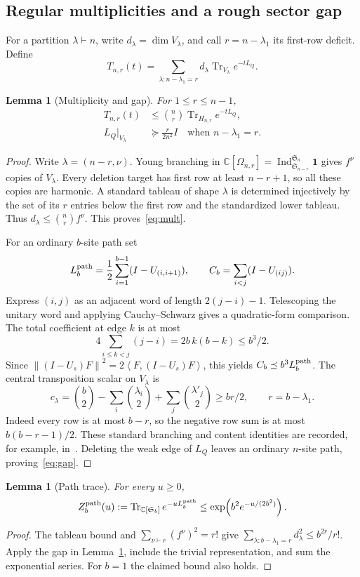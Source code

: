 \documentclass[11pt]{article}
\newtheorem{lemma}[theorem]{Lemma}
\theoremstyle{remark}
\newcommand{\C}{\mathbb C}
\newcommand{\Sn}{\mathfrak S_n}
\newcommand{\Tr}{\operatorname{Tr}}
\newcommand{\ind}{\mathbf 1}
\newcommand{\norm}[1]{\left\lVert #1\right\rVert}
\newcommand{\ip}[2]{\left\langle #1,#2\right\rangle}
\begin{document}
\subsection{Regular multiplicities and a rough sector gap}
For a partition $\lambda\vdash n$, write $d_\lambda=\dim V_\lambda$, and call
$r=n-\lambda_1$ its first-row deficit. Define
\[
 T_{n,r}(t)=\sum_{\lambda:n-\lambda_1=r}d_\lambda\Tr_{V_\lambda}e^{-tL_Q}.
\]
\begin{lemma}[Multiplicity and gap]\label{lem:multgap}
For $1\leq r\leq n-1$,
\begin{align}
 T_{n,r}(t)&\leq\binom nr\Tr_{H_{n,r}}e^{-tL_Q},\label{eq:mult}\\
 L_Q|_{V_\lambda}&\succeq \frac r{2n^2}I
 \quad\text{when }n-\lambda_1=r.\label{eq:gap}
\end{align}
\end{lemma}
\begin{proof}
Write $\lambda=(n-r,\nu)$. Young branching in
$\C[\Omega_{n,r}]=\operatorname{Ind}_{\mathfrak S_{n-r}}^{\Sn}\ind$
gives $f^\nu$ copies of $V_\lambda$. Every deletion target has first row at least $n-r+1$, so all these copies are harmonic. A standard tableau of shape $\lambda$ is determined injectively by the set of its $r$ entries below the first row and the standardized lower tableau. Thus
$d_\lambda\leq\binom nr f^\nu$. This proves~\eqref{eq:mult}.

For an ordinary $b$-site path set
\[
 L_b^{\rm path}=\frac12\sum_{i=1}^{b-1}(I-U_{(i,i+1)}),\qquad
 C_b=\sum_{i<j}(I-U_{(ij)}).
\]
Express $(i,j)$ as an adjacent word of length $2(j-i)-1$. Telescoping the unitary word and applying Cauchy--Schwarz gives a quadratic-form comparison. The total coefficient at edge $k$ is at most
\[
 4\sum_{i\leq k<j}(j-i)=2b\,k(b-k)\leq b^3/2.
\]
Since $\norm{(I-U_s)F}^2=2\ip F{(I-U_s)F}$, this yields
$C_b\preceq b^3L_b^{\rm path}$.
The central transposition scalar on $V_\lambda$ is
\[
 c_\lambda=\binom b2-\sum_i\binom{\lambda_i}2+
                      \sum_j\binom{\lambda'_j}2\geq br/2,
 \qquad r=b-\lambda_1.
\]
Indeed every row is at most $b-r$, so the negative row sum is at most $b(b-r-1)/2$. These standard branching and content identities are recorded, for example, in~\cite{Sagan}. Deleting the weak edge of $L_Q$ leaves an ordinary $n$-site path, proving~\eqref{eq:gap}.
\end{proof}

\begin{lemma}[Path trace]\label{lem:pathtrace}
For every $u\geq0$,
\[
 Z_b^{\rm path}(u):=\Tr_{\C[\mathfrak S_b]}e^{-uL_b^{\rm path}}
 \leq\exp\!\left(b^2e^{-u/(2b^2)}\right).
\]
\end{lemma}
\begin{proof}
The tableau bound and $\sum_{\nu\vdash r}(f^\nu)^2=r!$ give
$\sum_{\lambda:b-\lambda_1=r}d_\lambda^2\leq b^{2r}/r!$. Apply the gap in Lemma~\ref{lem:multgap}, include the trivial representation, and sum the exponential series. For $b=1$ the claimed bound also holds.
\end{proof}
\end{document}
